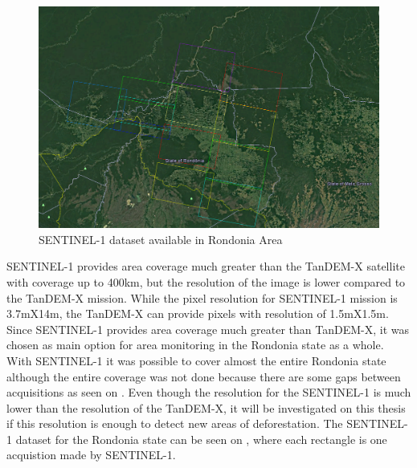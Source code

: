\begin{figure}[H]
    \centering
    \includegraphics[width=\linewidth]{Chapter2-real/sentinel_dataset.png}
    \caption{SENTINEL-1 dataset available in Rondonia Area}
    \label{fig:sentinel_dataset}
\end{figure}{}

SENTINEL-1 provides area coverage much greater than the TanDEM-X satellite with coverage up to 400km, but the resolution of the image is lower compared to the TanDEM-X mission. While the pixel resolution for SENTINEL-1 mission is 3.7mX14m, the TanDEM-X can provide pixels with resolution of 1.5mX1.5m. Since SENTINEL-1 provides area coverage much greater than TanDEM-X, it was chosen as main option for area monitoring in the Rondonia state as a whole. With SENTINEL-1 it was possible to cover almost the entire Rondonia state although the entire coverage was not done because there are some gaps between acquisitions as seen on . Even though the resolution for the SENTINEL-1 is much lower than the resolution of the TanDEM-X, it will be investigated on this thesis if this resolution is enough to detect new areas of deforestation. The SENTINEL-1 dataset for the Rondonia state can be seen on , where each rectangle is one acquistion made by SENTINEL-1.